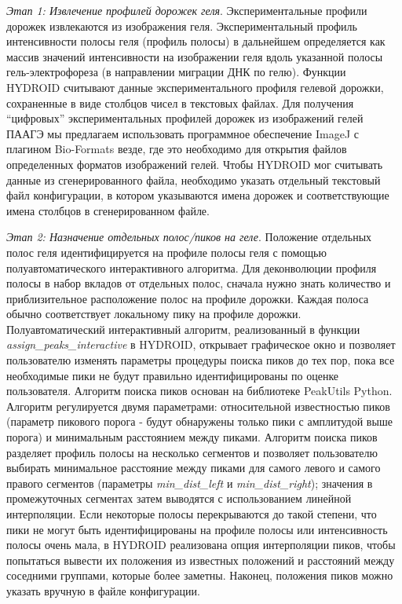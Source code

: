     \emph{Этап 1: Извлечение профилей дорожек геля}. Экспериментальные профили дорожек извлекаются из изображения геля. Экспериментальный профиль интенсивности полосы геля (профиль полосы) в дальнейшем определяется как массив значений интенсивности на изображении геля вдоль указанной полосы гель-электрофореза (в направлении миграции ДНК по гелю). Функции HYDROID считывают данные экспериментального профиля гелевой дорожки, сохраненные в виде столбцов чисел в текстовых файлах. Для получения ``цифровых'' экспериментальных профилей дорожек из изображений гелей ПААГЭ мы предлагаем использовать программное обеспечение ImageJ \cite{schneider_nih_2012} с плагином Bio-Formats \cite{linkert_metadata_2010} везде, где это необходимо для открытия файлов определенных форматов изображений гелей. 
    Чтобы HYDROID мог считывать данные из сгенерированного файла, необходимо указать отдельный текстовый файл конфигурации, в котором указываются имена дорожек и соответствующие имена столбцов в сгенерированном файле.

    \emph{Этап 2: Назначение отдельных полос/пиков на геле}. Положение отдельных полос геля идентифицируется на профиле полосы геля с помощью полуавтоматического интерактивного алгоритма. Для деконволюции профиля полосы в набор вкладов от отдельных полос, сначала нужно знать количество и приблизительное расположение полос на профиле дорожки. Каждая полоса обычно соответствует локальному пику на профиле дорожки. Полуавтоматический интерактивный алгоритм, реализованный в
     функции \textit{assign\_peaks\_interactive} в HYDROID, открывает графическое окно и позволяет пользователю изменять параметры процедуры поиска пиков до тех пор, пока все необходимые пики не будут правильно идентифицированы по оценке пользователя. Алгоритм поиска пиков основан на библиотеке PeakUtils Python.
      Алгоритм регулируется двумя параметрами: относительной известностью пиков (параметр пикового порога - будут обнаружены только пики с амплитудой выше порога) и минимальным расстоянием между пиками. Алгоритм поиска пиков разделяет профиль полосы на несколько сегментов и позволяет пользователю выбирать минимальное расстояние между пиками для самого левого и самого правого сегментов (параметры \textit{min\_dist\_left} и \textit{min\_dist\_right}); значения в промежуточных сегментах затем выводятся с использованием линейной интерполяции. Если некоторые полосы перекрываются до такой степени, что пики не могут быть идентифицированы на профиле полосы или интенсивность полосы очень мала, в HYDROID реализована опция интерполяции пиков, чтобы попытаться вывести их положения из известных положений и расстояний между соседними группами, которые более заметны. Наконец, положения пиков можно указать вручную в файле конфигурации.


